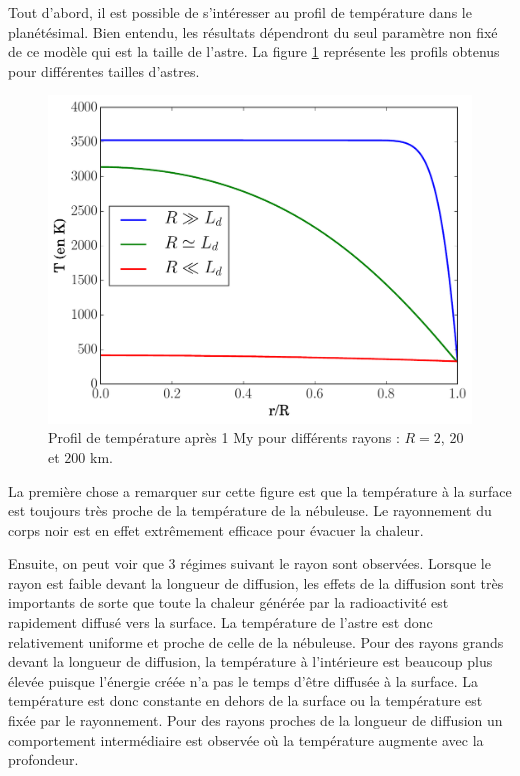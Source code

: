 \documentclass[10pt,a4paper]{article}
\numberwithin{equation}{section}
\begin{document}
Tout d'abord, il est possible de s'intéresser au profil de température dans le planétésimal. Bien entendu, les résultats dépendront du seul paramètre non fixé de ce modèle qui est la taille de l'astre. La figure \ref{diffusion2} représente les profils obtenus pour différentes tailles d'astres. 

\begin{figure}[h]
    \centering	    
	\includegraphics[scale=0.5]{figures/diffusion2.pdf}
    \caption{Profil de température après 1 My pour différents rayons : $R= 2$, $20$ et $200$ km. }
    	\label{diffusion2} 
\end{figure}

La première chose a remarquer sur cette figure est que la température à la surface est toujours très proche de la température de la nébuleuse. Le rayonnement du corps noir est en effet extrêmement efficace pour évacuer la chaleur. 
\medskip

Ensuite, on peut voir que 3 régimes suivant le rayon sont observées. Lorsque le rayon est faible devant la longueur de diffusion, les effets de la diffusion sont très importants de sorte que toute la chaleur générée par la radioactivité est rapidement diffusé vers la surface. La température de l'astre est donc relativement uniforme et proche de celle de la nébuleuse. Pour des rayons grands devant la longueur de diffusion, la température à l'intérieure est beaucoup plus élevée puisque l'énergie créée n'a pas le temps d'être diffusée à la surface. La température est donc constante en dehors de la surface ou la température est fixée par le rayonnement. Pour des rayons proches de la longueur de diffusion un comportement intermédiaire est observée où la température augmente avec la profondeur.
\end{document}
